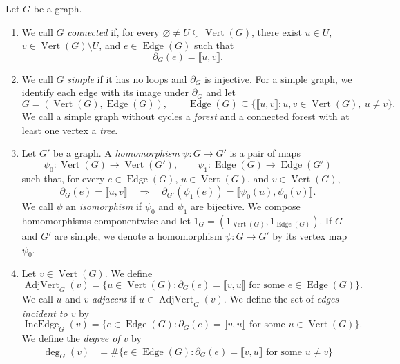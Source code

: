 \begin{definition}\label{def:graph-notions}
Let $G$ be a graph.
\begin{enumerate}[font=\itshape]
\item\label{d:graph-connected} We call $G$ \textit{connected} if, for every $\varnothing\ne U\subsetneq\operatorname{Vert}(G)$, there exist
$u\in U$, $v\in\operatorname{Vert}(G)\setminus U$, and $e\in\operatorname{Edge}(G)$ such that
\[
 \partial_G(e)=\llbracket u,v\rrbracket.
\]
\item We call $G$ \textit{simple} if it has no loops and $\partial_G$ is injective.
For a simple graph, we identify each edge with its image under $\partial_G$ and let
\[
 G=(\operatorname{Vert}(G),\operatorname{Edge}(G)),\qquad
 \operatorname{Edge}(G)\subseteq
 \{\llbracket u,v\rrbracket:u,v\in\operatorname{Vert}(G),\ u\ne v\}.
\]
We call a simple graph without cycles a \textit{forest} and a connected forest with at least one vertex a \textit{tree}.
\item Let $G'$ be a graph. A \textit{homomorphism} $\psi:G\to G'$ is a pair of maps
\[
 \psi_0:\operatorname{Vert}(G)\longrightarrow\operatorname{Vert}(G'),\qquad
 \psi_1:\operatorname{Edge}(G)\longrightarrow\operatorname{Edge}(G')
\]
such that, for every $e\in\operatorname{Edge}(G)$, $u\in\operatorname{Vert}(G)$, and $v\in\operatorname{Vert}(G)$,
\[
 \partial_G(e)=\llbracket u,v\rrbracket\quad\Longrightarrow\quad
 \partial_{G'}(\psi_1(e))=\llbracket \psi_0(u),\psi_0(v)\rrbracket.
\]
We call $\psi$ an \textit{isomorphism} if $\psi_0$ and $\psi_1$ are bijective.
We compose homomorphisms componentwise and let
$1_G=(1_{\operatorname{Vert}(G)},1_{\operatorname{Edge}(G)})$.
If $G$ and $G'$ are simple, we denote a homomorphism $\psi:G\to G'$ by its vertex map $\psi_0$.
\item Let $v\in\operatorname{Vert}(G)$. We define
\[
 \operatorname{AdjVert}_G(v)=\{u\in\operatorname{Vert}(G):
 \partial_G(e)=\llbracket v,u\rrbracket\text{ for some }e\in\operatorname{Edge}(G)\}.
\]
We call $u$ and $v$ \textit{adjacent} if $u\in\operatorname{AdjVert}_G(v)$.
We define the set of \textit{edges incident to $v$} by
\[
 \operatorname{IncEdge}_G(v)
 =\{e\in\operatorname{Edge}(G):\partial_G(e)=\llbracket v,u\rrbracket
 \text{ for some }u\in\operatorname{Vert}(G)\}.
\]
We define the \textit{degree of $v$} by
\[
\begin{aligned}
 \deg_G(v)
 &=\#\{e\in\operatorname{Edge}(G):\partial_G(e)=\llbracket v,u\rrbracket
       \text{ for some }u\ne v\}\\

\end{aligned}\]
\end{enumerate}
\end{definition}

